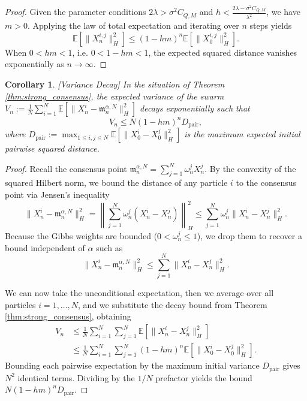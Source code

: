 \documentclass[12pt]{amsart}
\numberwithin{equation}{section}
\newtheorem{corollary}[theorem]{Corollary}
\begin{document}
\begin{proof}
Given the parameter conditions $2\lambda > \sigma^2 C_{Q,M}$ and $h < \frac{2\lambda - \sigma^2 C_{Q,M}}{\lambda^2}$, we have $m > 0$.
Applying the law of total expectation and iterating over $n$ steps yields
\begin{equation*}
    \mathbb{E}[\|X_n^{i,j}\|_H^2] \le (1 - hm)^n \mathbb{E}[\|X_0^{i,j}\|_H^2].
\end{equation*}
When $0<hm<1$, i.e. $0 < 1 - hm < 1$, the expected squared distance vanishes exponentially as $n \to \infty$.
\end{proof}

\begin{corollary}
[Variance Decay]
\label{cor:variance_decay}
In the situation of Theorem \ref{thm:strong_consensus}, the expected  variance of the swarm $V_n := \frac{1}{N} \sum_{i=1}^N \mathbb{E}[\|X_n^i - \mathfrak{m}_n^{\alpha, N}\|_H^2]$ decays exponentially such that
\begin{equation*}
    V_n \le N (1 - hm)^n D_{\text{pair}},
\end{equation*}
where $D_{\text{pair}} := \max_{1 \le i, j \le N} \mathbb{E}[\|X_0^i - X_0^j\|_H^2]$ is the maximum expected initial pairwise squared distance.
\end{corollary}

\begin{proof}
Recall the consensus point $\mathfrak{m}_n^{\alpha, N} = \sum_{j=1}^N \omega_n^j X_n^j$. By the convexity of the squared Hilbert norm, we bound the distance of any particle $i$ to the consensus point via Jensen's inequality
\begin{equation*}
    \|X_n^i - \mathfrak{m}_n^{\alpha, N}\|_H^2 = \left\| \sum_{j=1}^N \omega_n^j (X_n^i - X_n^j) \right\|_H^2 \le \sum_{j=1}^N \omega_n^j \|X_n^i - X_n^j\|_H^2.
\end{equation*}
Because the Gibbs weights are bounded ($0<\omega_n^j \le 1$), we drop them to recover a bound independent of $\alpha$ such as
\begin{equation*}
    \|X_n^i - \mathfrak{m}_n^{\alpha, N}\|_H^2 \le \sum_{j=1}^N \|X_n^i - X_n^j\|_H^2.
\end{equation*}

We can now take the unconditional expectation, then we average over all particles $i = 1, \dots, N$, and we substitute the decay bound from Theorem \ref{thm:strong_consensus}, obtaining
\begin{align*}
    V_n &\le \frac{1}{N} \sum_{i=1}^N \sum_{j=1}^N \mathbb{E}[\|X_n^i - X_n^j\|_H^2] \\
    &\le \frac{1}{N} \sum_{i=1}^N \sum_{j=1}^N (1 - hm)^n \mathbb{E}[\|X_0^i - X_0^j\|_H^2].
\end{align*}
Bounding each pairwise expectation by the maximum initial variance $D_{\text{pair}}$ gives $N^2$ identical terms. Dividing by the $1/N$ prefactor yields the  bound $N(1-hm)^n D_{\text{pair}}$.
\end{proof}
\end{document}
